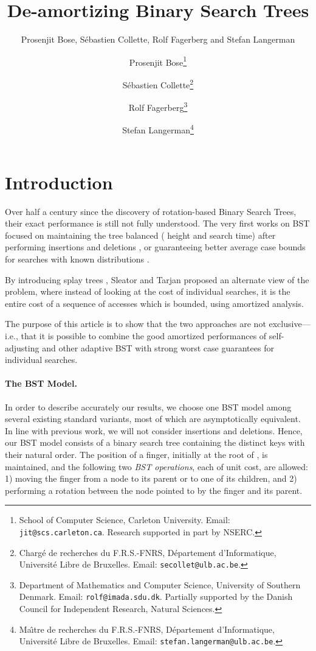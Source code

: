 \documentclass[11pt]{article}
\title{De-amortizing Binary Search Trees}
\author{Prosenjit Bose, S\'ebastien Collette, Rolf Fagerberg and
  Stefan Langerman}
\author{
Prosenjit Bose\thanks{School of Computer Science, Carleton
University. Email: \texttt{jit@scs.carleton.ca}. Research supported in
part by NSERC.}
\and
S\'ebastien Collette\thanks{Charg\'e de recherches du F.R.S.-FNRS,
  Département d'Informatique, Universit\'e Libre de Bruxelles. 
Email: \texttt{secollet@ulb.ac.be}.}
\and
Rolf Fagerberg\thanks{Department of Mathematics and Computer Science,
University of Southern Denmark. Email: \texttt{rolf@imada.sdu.dk}.
Partially supported by
the Danish Council for Independent Research, Natural Sciences.}
\and 
Stefan Langerman\thanks{Ma{\^\i}tre de recherches du F.R.S.-FNRS,
  Département d'Informatique, Universit\'e Libre de Bruxelles. 
Email: \texttt{stefan.langerman@ulb.ac.be}.}
}
\date{}
\begin{document}
\maketitle
{}

\thispagestyle{empty}

\newpage

\setcounter{page}{1}

\section{Introduction}

Over half a century since the discovery of rotation-based Binary Search
Trees, their exact performance is still not fully understood.
The very first works on BST focused on maintaining the tree balanced
( height and search time) after performing insertions and
deletions  \cite{avl,redblack}, or guaranteeing better average case bounds
for searches with known distributions \cite{optimum1}.

By introducing splay trees \cite{splay}, Sleator and Tarjan proposed an
alternate view of the problem, where instead of looking at the cost of
individual searches, it is the entire cost of a sequence of accesses
which is bounded, using amortized analysis.

The purpose of this article is to show that the two approaches are not
exclusive---i.e., that it is possible to combine the good amortized
performances of self-adjusting and other adaptive BST with strong worst
case guarantees for individual searches.

\paragraph{The BST Model.}
In order to describe accurately our results, we choose one BST model among
several existing standard variants, most of which are asymptotically
equivalent. In line with previous work, we will not consider insertions and
deletions. Hence, our BST model consists of a binary search tree 
containing the  distinct keys  with their natural
order. The position of a finger, initially at the root of , is
maintained, and the following two \emph{BST operations}, each of unit cost,
are allowed: 1) moving the finger from a node to its parent or to one of
its children, and 2) performing a rotation between the node pointed to by
the finger and its parent.
\end{document}
